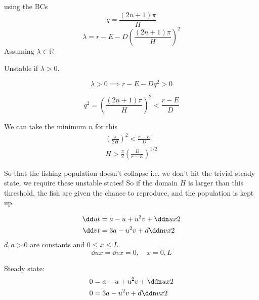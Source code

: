 \documentclass{X:/Documents/Coding/Latex/myassignment}
\begin{document}
using the BCs
\[q = \frac{(2n + 1)\pi}{H}\]
\[\lambda= r - E - D\left(\frac{(2n + 1)\pi}{H}\right)^2\]
Assuming $\lambda \in \mathbb{R}$

Unstable if $\lambda > 0 $.

\[\lambda > 0 \implies r - E - Dq^2 > 0\]

\[q^2 = \left(\frac{(2n + 1)\pi}{H}\right)^2 < \frac{r -E}{D} \]

We can take the minimum $n$ for this 
\begin{align*}
	\left(\frac{\pi}{2H}\right)^2 < \frac{r-E}{D}\\
	H > \frac{\pi}{2} \left(\frac{D}{r-E}\right)^{1/2}
\end{align*}

So that the fishing population doesn't collapse i.e. we don't hit the trivial steady state, we require these unstable states! So if the domain $H$ is larger than this threshold, the fish are given the chance to reproduce, and the population is kept up.


\begin{align*}
	\dd ut &= a -u + u^2v + \ddn ux2\\
	\dd vt &= 3a - u^2v + d \ddn vx2
\end{align*}
$d,a > 0$ are constants and $0\leq x \leq L$.
\[\dd ux = \dd vx = 0, \quad x=0, L\]

Steady state:
\begin{align*}
	0&= a - u + u^2v + \ddn ux2\\
	0&= 3a - u^2 v + d \ddn vx2
\end{align*}
\end{document}

